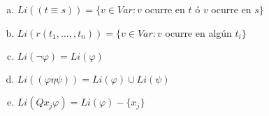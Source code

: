   \begin{lemma} \label{lemma_44}
    \PN \newline
    \begin{enumerate}[(a)]
      \item $Li((t \equiv s)) = \{v \in Var: v$ ocurre en $t$ ó $v$ ocurre en $s\}$
      \item $Li(r(t_{1}, \dotsc, ,t_{n})) = \{v \in Var: v$ ocurre en algún $t_{i}\}$
      \item $Li(\lnot \varphi) = Li(\varphi)$
      \item $Li((\varphi \eta \psi)) = Li(\varphi) \cup Li(\psi)$
      \item $Li(Qx_{j}\varphi) = Li(\varphi)-\{x_{j}\}$
    \end{enumerate}
  \end{lemma}
